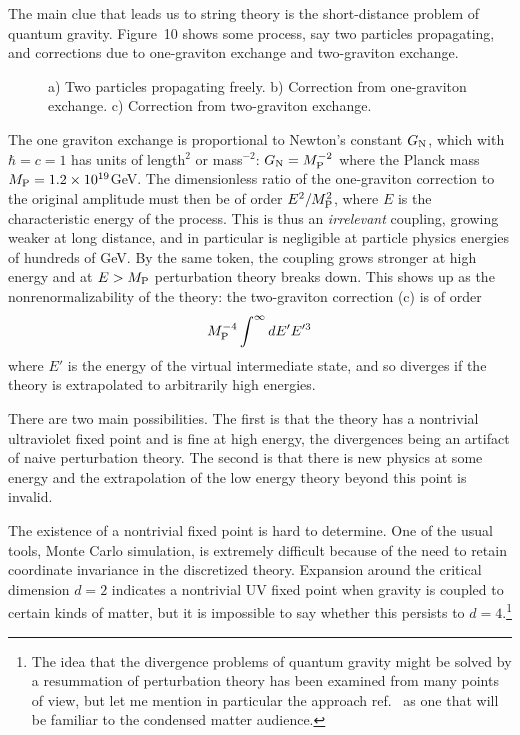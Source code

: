 The main clue that leads us to string theory is the short-distance
problem of quantum gravity.  Figure~10 shows some process,
say two particles propagating, and corrections due to
one-graviton exchange and two-graviton exchange.
\begin{figure}
\begin{center}
\leavevmode
{}
\end{center}
\caption[]{a) Two particles propagating freely.
b) Correction from one-graviton exchange.
c) Correction from two-graviton exchange.}
\end{figure}
The one graviton exchange is proportional to Newton's constant
$G_{\rm N}$, which with $\hbar = c = 1$ has units of length$^2$ or
mass$^{-2}$: $G_{\rm N} = M_{\rm P}^{-2}$ where the Planck mass
$M_{\rm P} = 1.2 \times 10^{19}$GeV.  The dimensionless ratio of the
one-graviton correction to the original amplitude must then be of
order $E^2 / M_{\rm P}^2$, where $E$ is the characteristic energy
of the process. 
This is thus an {\it irrelevant} coupling, growing weaker at long
distance, and in particular is negligible at particle physics
energies of hundreds of GeV.  By the same token, the coupling
grows stronger at high energy and at $E > M_{\rm P}$ perturbation
theory breaks down.  This shows up as the nonrenormalizability of the
theory: the two-graviton correction (c) is of order
\begin{equation}
M_{\rm P}^{-4} \int^\infty dE' E'^3
\end{equation}
where $E'$ is the energy of the virtual intermediate state,
and so diverges if the theory is extrapolated to arbitrarily high
energies. 

There are two main possibilities.  The first is that the theory
has a nontrivial ultraviolet fixed point and is fine at high energy,
the divergences being an artifact of naive perturbation theory.
The second is that there is new physics at some energy and the
extrapolation of the low energy theory beyond this point is invalid.

The existence of a nontrivial fixed point is hard to determine.
One of the usual tools, Monte Carlo simulation, is extremely
difficult because of the need to retain coordinate invariance
in the discretized theory.  Expansion
around the critical dimension $d = 2$ indicates a nontrivial UV
fixed point when gravity is coupled to certain kinds of matter,
but it is impossible to say whether this persists to $d=4$.\footnote
{The idea that the divergence problems of
quantum gravity might be solved
by a resummation of perturbation theory has been examined from many
points of view, but let me mention in particular the
approach ref.~\cite{Weps} as one that will be familiar to the
condensed matter audience.}

